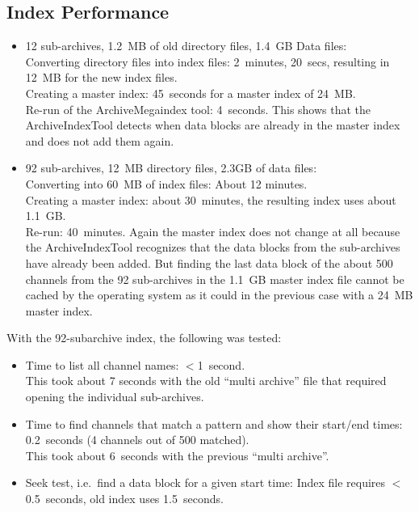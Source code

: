\subsection{Index Performance}
\begin{itemize}
\item 12 sub-archives, 1.2~MB of old directory files, 1.4~GB Data
      files:\\
      Converting directory files into index files:
      2~minutes, 20~secs, resulting in 12~MB for the new index files.\\
      Creating a master index: 45~seconds for a master index of 24~MB.\\
      Re-run of the ArchiveMegaindex tool: 4~seconds.
      This shows that the ArchiveIndexTool detects when data blocks
      are already in the master index and does not add them again.
\item 92 sub-archives, 12~MB directory files, 2.3GB of data files:\\
      Converting into 60~MB of index files: About 12 minutes.\\
      Creating a master index: about 30~minutes, the resulting
      index uses about 1.1~GB.\\
      Re-run: 40~minutes. Again the master index does not change at
      all because the ArchiveIndexTool recognizes that the data blocks
      from the sub-archives have already been added. But finding the
      last data block of the about 500 channels from the 92
      sub-archives in the 1.1~GB master index file cannot be cached by
      the operating system as it could in the previous case with a
      24~MB master index.
\end{itemize}

\noindent With the 92-subarchive index, the following was tested:
\begin{itemize}
\item Time to list all channel names: $<$1~second.\\
      This took about 7 seconds with the old ``multi archive'' file
      that required opening the individual sub-archives.
\item Time to find channels that match a pattern and show their
      start/end times: 0.2~seconds (4 channels out of 500 matched).\\
      This took about 6~seconds with the previous ``multi archive''.
\item Seek test, i.e.\ find a data block for a given start time:
      Index file requires $<$0.5~seconds, old index uses 1.5~seconds.
\end{itemize}

